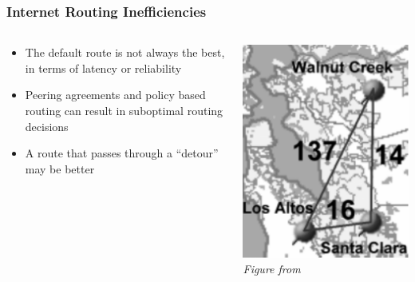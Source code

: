 \documentclass{beamer}
\begin{document}
\begin{frame}
  \frametitle{Internet Routing Inefficiencies}
  \begin{columns}
  \begin{column}{0.7\textwidth}
  \begin{itemize}
  \item The default route is not always the best, in terms of latency or
    reliability
  \item Peering agreements and policy based routing can result in suboptimal
    routing decisions \cite{detour}
  \item A route that passes through a ``detour'' may be better
  \end{itemize}
  \end{column}
  \begin{column}{0.3\textwidth}
    \includegraphics[width=\textwidth]{figures/detour.png} \\
    \textit{Figure from \cite{detour}}
  \end{column}
  \end{columns}
\end{frame}
\end{document}
